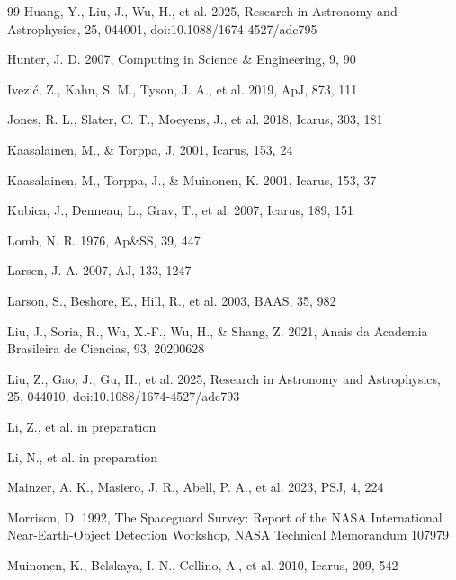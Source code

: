 \documentclass[referee]{raa}
\begin{document}
\begin{thebibliography}{99}
Huang, Y., Liu, J., Wu, H., et al. 2025, Research in Astronomy and Astrophysics, 25, 044001, doi:10.1088/1674-4527/adc795

Hunter, J. D. 2007, Computing in Science \& Engineering, 9, 90

Ivezi\'c, Z., Kahn, S. M., Tyson, J. A., et al. 2019, ApJ, 873, 111

Jones, R. L., Slater, C. T., Moeyens, J., et al. 2018, Icarus, 303, 181

Kaasalainen, M., \& Torppa, J. 2001, Icarus, 153, 24

Kaasalainen, M., Torppa, J., \& Muinonen, K. 2001, Icarus, 153, 37

Kubica, J., Denneau, L., Grav, T., et al. 2007, Icarus, 189, 151

Lomb, N. R. 1976, Ap\&SS, 39, 447

Larsen, J. A. 2007, AJ, 133, 1247

Larson, S., Beshore, E., Hill, R., et al. 2003, BAAS, 35, 982

Liu, J., Soria, R., Wu, X.-F., Wu, H., \& Shang, Z. 2021, Anais da Academia Brasileira de Ciencias, 93, 20200628

Liu, Z., Gao, J., Gu, H., et al. 2025, Research in Astronomy and Astrophysics, 25, 044010, doi:10.1088/1674-4527/adc793

Li, Z., et al. in preparation

Li, N., et al. in preparation

Mainzer, A. K., Masiero, J. R., Abell, P. A., et al. 2023, PSJ, 4, 224

Morrison, D. 1992, The Spaceguard Survey: Report of the NASA International Near-Earth-Object Detection Workshop, NASA Technical Memorandum 107979

Muinonen, K., Belskaya, I. N., Cellino, A., et al. 2010, Icarus, 209, 542


\end{thebibliography}
\end{document}
